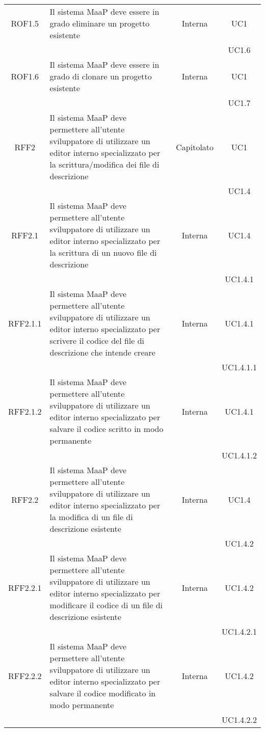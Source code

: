 \begin{longtable}{|c|p{6cm}|c|c|}
\midrule
ROF1.5
& Il sistema MaaP deve essere in grado eliminare un progetto esistente
& Interna
& UC1\\
& & & UC1.6
\\

\midrule
ROF1.6
& Il sistema MaaP deve essere in grado di clonare un progetto esistente
& Interna
& UC1\\
& & & UC1.7
\\

\midrule
RFF2
& Il sistema MaaP deve permettere all'utente sviluppatore di utilizzare un editor interno specializzato per la scrittura/modifica dei file di descrizione
& Capitolato
& UC1\\
& & & UC1.4
\\

\midrule
RFF2.1
& Il sistema MaaP deve permettere all'utente sviluppatore di utilizzare un editor interno specializzato per la scrittura di un nuovo file di descrizione
& Interna
& UC1.4 \\
& & & UC1.4.1
\\

\midrule
RFF2.1.1
& Il sistema MaaP deve permettere all'utente sviluppatore di utilizzare un editor interno specializzato per scrivere il codice del file di descrizione che intende creare
& Interna
& UC1.4.1 \\
& & & UC1.4.1.1
\\

\midrule
RFF2.1.2
& Il sistema MaaP deve permettere all'utente sviluppatore di utilizzare un editor interno specializzato per salvare il codice scritto in modo permanente
& Interna
& UC1.4.1 \\
& & & UC1.4.1.2
\\

\midrule
RFF2.2
& Il sistema MaaP deve permettere all'utente sviluppatore di utilizzare un editor interno specializzato per la modifica di un file di descrizione esistente
& Interna
& UC1.4 \\
& & & UC1.4.2
\\

\midrule
RFF2.2.1
& Il sistema MaaP deve permettere all'utente sviluppatore di utilizzare un editor interno specializzato per modificare il codice di un file di descrizione esistente
& Interna
& UC1.4.2 \\
& & & UC1.4.2.1
\\

\midrule
RFF2.2.2
& Il sistema MaaP deve permettere all'utente sviluppatore di utilizzare un editor interno specializzato per salvare il codice modificato in modo permanente
& Interna
& UC1.4.2 \\
& & & UC1.4.2.2
\\


\end{longtable}
